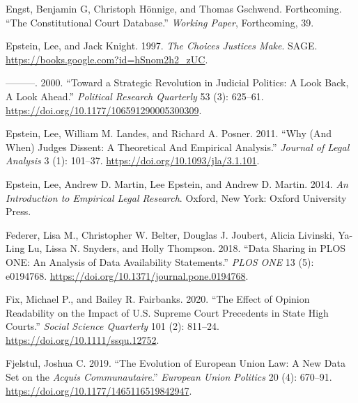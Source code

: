 \documentclass[
  11pt,
]{article}
\newlength{\cslhangindent}
\newenvironment{CSLReferences}[2] %
 {%
  \setlength{\parindent}{0pt}
  \ifodd #1 \everypar{\setlength{\hangindent}{\cslhangindent}}\ignorespaces\fi
  \ifnum #2 > 0
  \setlength{\parskip}{#2\baselineskip}
  \fi
 }%
 {}
\begin{document}
\begin{CSLReferences}{1}{0}
\leavevmode{}%
Engst, Benjamin G, Christoph Hönnige, and Thomas Gschwend. Forthcoming.
{``The {Constitutional Court Database}.''} \emph{Working Paper},
Forthcoming, 39.

\leavevmode{}%
Epstein, Lee, and Jack Knight. 1997. \emph{The {Choices Justices Make}}.
{SAGE}. \url{https://books.google.com?id=hSnom2h2_zUC}.

\leavevmode{}%
---------. 2000. {``Toward a {Strategic Revolution} in {Judicial
Politics}: {A Look Back}, {A Look Ahead}.''} \emph{Political Research
Quarterly} 53 (3): 625--61.
\url{https://doi.org/10.1177/106591290005300309}.

\leavevmode{}%
Epstein, Lee, William M. Landes, and Richard A. Posner. 2011. {``Why
({And When}) {Judges Dissent}: {A Theoretical And Empirical
Analysis}.''} \emph{Journal of Legal Analysis} 3 (1): 101--37.
\url{https://doi.org/10.1093/jla/3.1.101}.

\leavevmode{}%
Epstein, Lee, Andrew D. Martin, Lee Epstein, and Andrew D. Martin. 2014.
\emph{An {Introduction} to {Empirical Legal Research}}. {Oxford, New
York}: {Oxford University Press}.

\leavevmode{}%
Federer, Lisa M., Christopher W. Belter, Douglas J. Joubert, Alicia
Livinski, Ya-Ling Lu, Lissa N. Snyders, and Holly Thompson. 2018.
{``Data Sharing in {PLOS ONE}: {An} Analysis of {Data Availability
Statements}.''} \emph{PLOS ONE} 13 (5): e0194768.
\url{https://doi.org/10.1371/journal.pone.0194768}.

\leavevmode{}%
Fix, Michael P., and Bailey R. Fairbanks. 2020. {``The {Effect} of
{Opinion Readability} on the {Impact} of {U}.{S}. {Supreme Court
Precedents} in {State High Courts}.''} \emph{Social Science Quarterly}
101 (2): 811--24. \url{https://doi.org/10.1111/ssqu.12752}.

\leavevmode{}%
Fjelstul, Joshua C. 2019. {``The Evolution of {European Union} Law: {A}
New Data Set on the {\emph{Acquis Communautaire}}.''} \emph{European
Union Politics} 20 (4): 670--91.
\url{https://doi.org/10.1177/1465116519842947}.


\end{CSLReferences}
\end{document}
